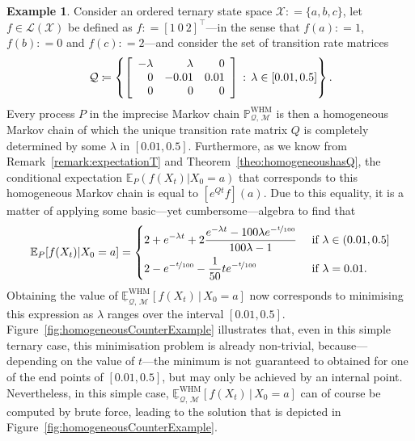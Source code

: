 \documentclass[10pt,a4paper]{paper}
\theoremstyle{definition}
\newtheorem{exmp}{Example}%
\newcommand{\states}{\mathcal{X}}
\newcommand{\processes}{\mathbb{P}}
\newcommand{\whmprocesses}{\processes^{\mathrm{WHM}}}
\newcommand{\gambles}{\mathcal{L}}
\newcommand{\gamblesX}{\gambles(\states)}
\newcommand{\rateset}{\mathcal{Q}}
\newcommand{\coloneqq}{:\!=}
\begin{document}
\begin{exmp}\label{ex:homogeneousexample}
Consider an ordered ternary state space $\states\coloneqq \{a,b,c\}$,  let $f\in\gamblesX$ be defined as $f\coloneqq [1~0~2]^\top$---in the sense that $f(a)\coloneqq1$, $f(b)\coloneqq0$ and $f(c)\coloneqq2$---and consider the set of transition rate matrices
\vspace{4pt}
\begin{equation*}
\rateset \coloneqq \left\{ \left[\begin{array}{rrr}
-\lambda & \lambda & 0 \\
0 & -0.01 & 0.01 \\
0 & 0 & 0
\end{array}\right] \,:\,\lambda\in[0.01,0.5]\right\}.
\vspace{4pt}
\end{equation*}
Every process $P$ in the imprecise Markov chain $\whmprocesses_{\rateset,\,\mathcal{M}}$ is then a homogeneous Markov chain of which the unique transition rate matrix $Q$ is completely determined by some $\lambda$ in $[0.01,0.5]$. Furthermore, as we know from Remark~\ref{remark:expectationT} and Theorem~\ref{theo:homogeneoushasQ}, the conditional expectation $\mathbb{E}_P(f(X_t)\vert X_0=a)$ that corresponds to this homogeneous Markov chain is equal to $[e^{Q t}f](a)$. Due to this equality, it is a matter of applying some basic---yet cumbersome---algebra to find that 
\begin{align*}
\mathbb{E}_P[f(X_t)\vert X_0=a]
=
\begin{cases}
\displaystyle
2+e^{-\lambda t}+2\frac{e^{-\lambda t}-100\lambda e^{-\nicefrac{t}{100}}}{100\lambda-1}&\text{ if $\lambda\in(0.01,0.5]$}\\[8pt]
\displaystyle
2-e^{-\nicefrac{t}{100}}-\frac{1}{50}te^{-\nicefrac{t}{100}}&\text{ if $\lambda=0.01$.}
\end{cases}
\end{align*}
Obtaining the value of $\underline{\mathbb{E}}_{\rateset,\,\mathcal{M}}^{\mathrm{WHM}}[f(X_t)\,\vert\,X_0=a]$ now corresponds to minimising this expression as $\lambda$ ranges over the interval $[0.01,0.5]$. Figure~\ref{fig:homogeneousCounterExample} illustrates that, even in this simple ternary case, this minimisation problem is already non-trivial, because---depending on the value of $t$---the minimum is not guaranteed to obtained for one of the end points of $[0.01,0.5]$, but may only be achieved by an internal point. Nevertheless, in this simple case, $\underline{\mathbb{E}}_{\rateset,\,\mathcal{M}}^{\mathrm{WHM}}[f(X_t)\,\vert\,X_0=a]$ can of course be computed by brute force, leading to the solution that is depicted in Figure~\ref{fig:homogeneousCounterExample}. 


\end{exmp}
\end{document}
